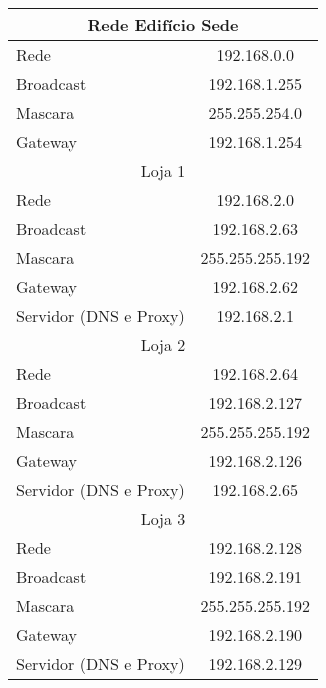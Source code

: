 \documentclass[a4paper,12pt]{article}
\begin{document}
\begin{table}[ht]
   \centering
   \begin{tabular}{ l | c }
      \toprule
      \multicolumn{2}{c}{Rede Edifício Sede} \\\hline 
      Rede & 192.168.0.0 \\\hline 
      Broadcast & 192.168.1.255 \\\hline 
      Mascara & 255.255.254.0 \\\hline
      Gateway & 192.168.1.254 \\\hline

      \multicolumn{2}{c}{Loja 1} \\\hline 
      Rede & 192.168.2.0 \\\hline 
      Broadcast & 192.168.2.63 \\\hline 
      Mascara & 255.255.255.192 \\\hline
      Gateway & 192.168.2.62 \\\hline
      Servidor (DNS e Proxy) & 192.168.2.1 \\\hline
      \multicolumn{2}{c}{Loja 2} \\\hline 
      Rede & 192.168.2.64 \\\hline 
      Broadcast & 192.168.2.127 \\\hline 
      Mascara & 255.255.255.192 \\\hline
      Gateway & 192.168.2.126 \\\hline
      Servidor (DNS e Proxy) & 192.168.2.65 \\\hline
      \multicolumn{2}{c}{Loja 3} \\\hline 
      Rede & 192.168.2.128 \\\hline 
      Broadcast & 192.168.2.191 \\\hline 
      Mascara & 255.255.255.192 \\\hline
      Gateway & 192.168.2.190 \\\hline
      Servidor (DNS e Proxy) & 192.168.2.129 \\\hline


\end{tabular}
\end{table}
\end{document}
